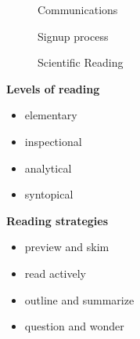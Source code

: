 \begin{frame}
\begin{figure}[htp]\centering
\caption{Communications}
\end{figure}
\end{frame}
\begin{frame}
\begin{figure}[htp]\centering
\caption{Signup process}
\end{figure}
\end{frame}
\begin{frame}
\begin{figure}[htp]\centering
\caption{Scientific Reading}
\end{figure}
\nocite{Adler.1972}\nocite{Keshav2016}
\end{frame}
\begin{frame}

\begin{multicols}{2}
\textbf{Levels of reading}\vspace{0.5cm}
\begin{itemize}\setlength\itemsep{1em}
  \item elementary
  \item inspectional
  \item analytical
  \item syntopical
\end{itemize}

\columnbreak

\textbf{Reading strategies}\vspace{0.5cm}
\begin{itemize}\setlength\itemsep{1em}
\item preview and skim
\item read actively
\item outline and summarize
\item question and wonder
\end{itemize}
\end{multicols}

\end{frame}

